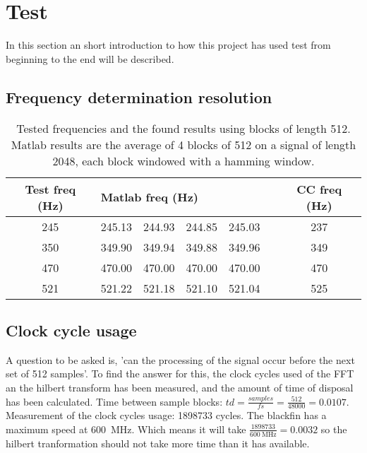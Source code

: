 
\section{Test}
In this section an short introduction to how this project has used test from beginning to the end will be described.
\subsection{Frequency determination resolution}
\begin{table}
	\centering
	\begin{tabular}{c | c c c c c | c}
		\toprule
		Test freq (Hz) & \multicolumn{4}{l}{Matlab freq (Hz)} & & CC freq (Hz) \\
		\midrule
		\num{245} & \num{245.13} & \num{244.93} & \num{244.85} & \num{245.03} && \num{237}\\
		\num{350} & \num{349.90} & \num{349.94} & \num{349.88} & \num{349.96} && \num{349}\\
		\num{470} & \num{470.00} & \num{470.00} & \num{470.00} & \num{470.00} && \num{470} \\
		\num{521} & \num{521.22} & \num{521.18} & \num{521.10} & \num{521.04} && \num{525} \\
		\bottomrule
	\end{tabular}
	\caption{Tested frequencies and the found results using blocks of length \num{512}. Matlab results are the average of 4 blocks of \num{512} on a signal of length \num{2048}, each block windowed with a hamming window.}
	\label{tab:test}
\end{table}

\subsection{Clock cycle usage}
A question to be asked is, 'can the processing of the signal occur before the next set of 512 samples'. To find the answer for this, the clock cycles used of the FFT an the hilbert transform has been measured, and the amount of time of disposal has been calculated.\newline
Time between sample blocks: $td = \frac{samples}{fs} = \frac{512}{48000} = 0.0107$. \newline
Measurement of the clock cycles usage: 1898733 cycles. \newline
The blackfin has a maximum speed at \SI{600}{\mega\hertz}. Which means it will take $\frac{1898733}{\SI{600}{\mega\hertz}} = 0.0032$ so the hilbert tranformation should not take more time than it has available.


\FloatBarrier